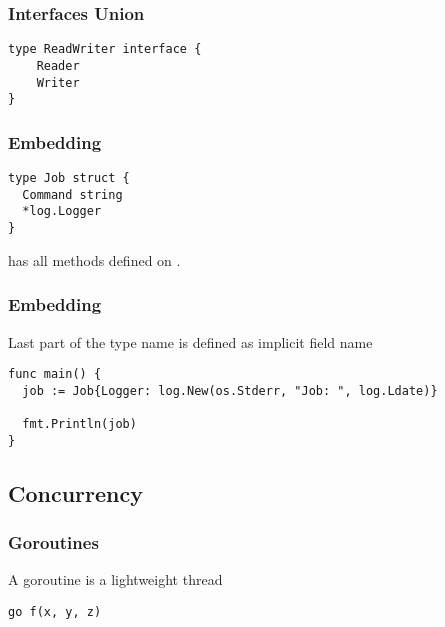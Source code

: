 \documentclass[xetex,mathserif,serif,12pt]{beamer}
\begin{document}
\begin{frame}[fragile]
  \frametitle{Interfaces Union}

  \begin{beamer@nomargin}
    \begin{lstlisting}
type ReadWriter interface {
    Reader
    Writer
}
    \end{lstlisting}
  \end{beamer@nomargin}
\end{frame}

\begin{frame}[fragile]
  \frametitle{Embedding}

  \begin{beamer@nomargin}
    \begin{lstlisting}
type Job struct {
  Command string
  *log.Logger
}
    \end{lstlisting}
  \end{beamer@nomargin}

   has all methods defined on .
\end{frame}

\begin{frame}[fragile]
  \frametitle{Embedding}
  Last part of the type name is defined as implicit field name

  \begin{beamer@nomargin}
    \begin{lstlisting}
func main() {
  job := Job{Logger: log.New(os.Stderr, "Job: ", log.Ldate)}

  fmt.Println(job)
}
    \end{lstlisting}
  \end{beamer@nomargin}
\end{frame}

\subsection{Concurrency}

\begin{frame}[fragile]
  \frametitle{Goroutines}

  A goroutine is a lightweight thread 
  \newline

  \begin{beamer@nomargin}
    \begin{lstlisting}
go f(x, y, z)
    \end{lstlisting}
  \end{beamer@nomargin}

\end{frame}
\end{document}
